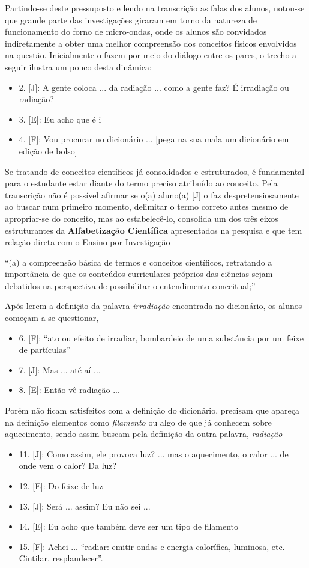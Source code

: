 Partindo-se deste pressuposto e lendo na transcrição as falas dos alunos, notou-se que grande parte das investigações giraram em torno da natureza de funcionamento do forno de micro-ondas, onde os alunos são convidados indiretamente a  obter uma melhor compreensão dos conceitos físicos envolvidos na questão. Inicialmente o fazem por meio do diálogo entre os pares, o trecho a seguir ilustra um pouco desta dinâmica:
\begin{itemize}
    \item 2. [J]: A gente coloca ... da radiação ... como a gente faz? É irradiação ou radiação?
    \item 3. [E]: Eu acho que é i
    \item 4. [F]: Vou procurar no dicionário ... [pega na sua mala um dicionário em edição de bolso]    
\end{itemize}
Se tratando de conceitos científicos já consolidados e estruturados, é fundamental para o estudante estar diante do termo preciso atribuído ao conceito. Pela transcrição não é possível afirmar se o(a) aluno(a) [J] o faz despretensiosamente ao buscar num primeiro momento, delimitar o termo correto antes mesmo de apropriar-se do conceito, mas ao estabelecê-lo, consolida um dos três eixos estruturantes da \textbf{Alfabetização Científica} apresentados na pesquisa e que tem relação direta com o Ensino por Investigação
\begin{citacao}
    ``(a) a compreensão básica de termos e conceitos científicos, retratando a importância de que os conteúdos curriculares próprios das ciências sejam debatidos na perspectiva de possibilitar o entendimento conceitual;'' \cite[p. 57]{SASSERON:2015}
\end{citacao}
Após lerem a definição da palavra \emph{irradiação} encontrada no dicionário, os alunos começam a se questionar,
\begin{itemize}
    \item 6. [F]: “ato ou efeito de irradiar, bombardeio de uma substância por um feixe de partículas”
    \item 7. [J]: Mas ... até aí ... 
    \item 8. [E]: Então vê radiação ...
\end{itemize}
Porém não ficam satisfeitos com a definição do dicionário, precisam que apareça na definição elementos como \emph{filamento} ou algo de que já conhecem sobre aquecimento, sendo assim buscam pela definição da outra palavra, \emph{radiação}
\begin{itemize}
    \item 11. [J]: Como assim, ele provoca luz? ... mas o aquecimento, o calor ... de onde vem o calor? Da luz?
    \item 12. [E]: Do feixe de luz
    \item 13. [J]: Será ... assim? Eu não sei ... 
    \item 14. [E]: Eu acho que também deve ser um tipo de filamento
    \item 15. [F]: Achei ... “radiar: emitir ondas e energia calorífica, luminosa, etc. Cintilar, resplandecer”.
\end{itemize}
